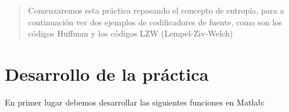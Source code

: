 \documentclass[es,practica]{uah}
\begin{document}

\maketitle

\begin{abstract}
Comenzaremos esta práctica repasando el concepto de entropía, para a continuación ver dos ejemplos de codificadores de fuente, como son los códigos Huffman y los códigos LZW (Lempel-Ziv-Welch)
\end{abstract}

\section{Desarrollo de la práctica}


En primer lugar debemos desarrollar las siguientes funciones en Matlab:
\end{document}
